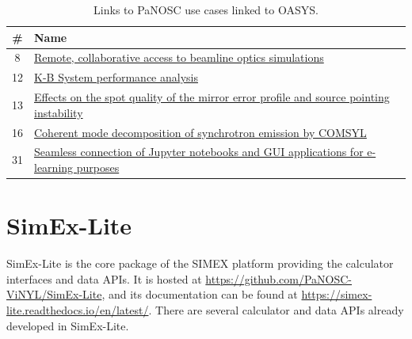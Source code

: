 \documentclass[11pt, a4paper]{article}
\begin{document}
\begin{table}[h!!!]
\centering
\begin{tabular}{c l}
\# & Name \\\hline
8 & \href{https://www.panosc.eu/use-cases/use-case-8-remote-collaborative-access-to-beamline-optics-simulations/}{Remote, collaborative access to beamline optics simulations} \\
12 & \href{https://www.panosc.eu/use-cases/panosc-use-case-12-k-b-system-performance-analysis/}{K-B System performance analysis} \\
13 & \href{https://www.panosc.eu/use-cases/panosc-use-case-13-effects-on-the-spot-quality-of-mirror-error-profile-and-source-pointing-instability/}{Effects on the spot quality of the mirror error profile and source pointing instability} \\
16 & \href{https://www.panosc.eu/use-cases/panosc-use-case-16-coherent-mode-decomposition-of-synchrotron-emission-by-comsyl/}{Coherent mode decomposition of synchrotron emission by COMSYL} \\
31 & \href{https://www.panosc.eu/use-cases/use-case-31-seamless-connection-of-jupyter-notebooks-and-gui-applications-for-e-learning-purposes/}{Seamless connection of Jupyter notebooks and GUI applications for e-learning purposes}
\end{tabular}
\caption{\label{tab:use_cases} Links to PaNOSC use cases linked to OASYS.}
\end{table}


\section{SimEx-Lite\label{sec:simex-lite}}

SimEx-Lite is the core package of the SIMEX platform providing the calculator interfaces and data APIs. It is hosted at \url{https://github.com/PaNOSC-ViNYL/SimEx-Lite}, and its documentation can be found at \url{https://simex-lite.readthedocs.io/en/latest/}. There are several calculator and data APIs already developed in SimEx-Lite. 
\end{document}
